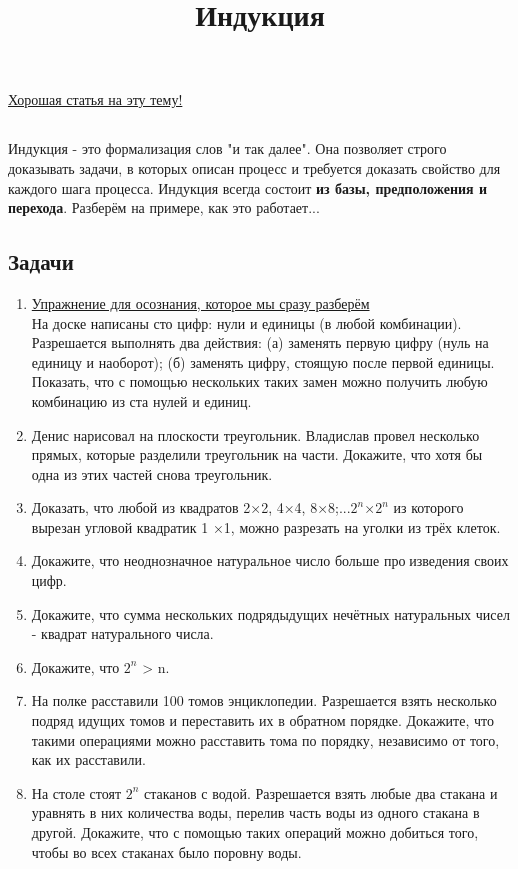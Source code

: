 \documentclass[a4paper,12pt]{article}
\title{Индукция}
\begin{document}
\maketitle
    \subsection*{} \href{chrome-extension://efaidnbmnnnibpcajpcglclefindmkaj/https://old.mccme.ru/free-books/shen/shen-induction.pdf}{Хорошая статья на эту тему!}
    \subsection*{} Индукция - это формализация слов "и так далее". Она позволяет строго доказывать задачи, в которых описан процесс и требуется доказать свойство для каждого шага процесса. Индукция всегда состоит \textbf{из базы, предположения и перехода}. Разберём на примере, как это работает...  
    \subsection*{Задачи}
    \begin{enumerate}
        \item \underline{Упражнение для осознания, которое мы сразу разберём}\\ На доске написаны сто цифр: нули и единицы (в любой комбинации). Разрешается выполнять два действия: (а) заменять первую цифру (нуль на единицу и наоборот); (б) заменять цифру, стоящую после первой единицы. Показать, что с помощью нескольких таких замен можно получить любую комбинацию из ста нулей и единиц.
        \item Денис нарисовал на плоскости треугольник. Владислав провел несколько прямых, которые разделили треугольник на части. Докажите, что хотя бы одна из этих частей снова треугольник.
        \item Доказать, что любой из квадратов 2×2, 4×4, 8×8;...$2^n$×$2^n$ из которого вырезан угловой квадратик 1 ×1, можно разрезать на уголки из трёх клеток.
        \item Докажите, что неоднозначное натуральное число больше произведения своих цифр.
        \item Докажите, что сумма нескольких подрядыдущих нечётных натуральных чисел - квадрат натурального числа.
        \item Докажите, что $2^n$ > n.
        \item На полке расставили 100 томов энциклопедии. Разрешается взять несколько подряд идущих томов и переставить их в обратном порядке. Докажите, что такими операциями можно расставить тома по порядку, независимо от того, как их расставили.
        \item На столе стоят $2^n$ стаканов с водой. Разрешается взять любые два стакана и уравнять в них количества воды, перелив часть воды из одного стакана в другой. Докажите, что с помощью таких операций можно добиться того, чтобы во всех стаканах было поровну воды.
    \end{enumerate}
\end{document}
